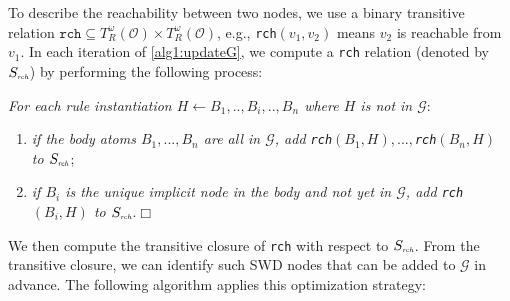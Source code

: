 \documentclass{article}
\begin{document}
To describe the reachability between two nodes, we use a
binary transitive relation $\texttt{rch} \subseteq T_R^{\omega}(\mathcal{O})\times T_R^{\omega}(\mathcal{O})$, e.g.,
\texttt{rch}$(v_1,v_2)$ means $v_2$ is reachable from $v_1$. In each iteration of \ref{alg1:updateG}, we compute a \texttt{rch}
relation (denoted by $S_{\textit{\tiny rch}}$) by performing the following process:
\begin{description}[leftmargin=4ex]
\item[(\textbf{\dag})] \emph{For each rule instantiation $H\leftarrow B_1,..,B_i,..,B_n$ where $H$ is not in $\mathcal{G}$}:
\begin{enumerate}
\item \emph{if the body atoms $B_1,...,B_n$ are all in $\mathcal{G}$, add \texttt{rch}$(B_1,H),...,$\texttt{rch}$(B_n,H)$ to $S_{\textit{\tiny rch}}$};
\item \emph{if $B_i$ is the unique implicit node in the body and not yet in $\mathcal{G}$, add \texttt{rch}$(B_i,H)$ to $S_{\textit{\tiny rch}}$}.\hfill$\Box$
\end{enumerate}
\end{description}



We then compute the transitive closure of \texttt{rch} with respect to $S_{\textit{\tiny rch}}$. From the transitive closure, we can identify such SWD nodes that can be added to $\mathcal{G}$ in advance. The following algorithm applies this optimization strategy:\\
\end{document}
